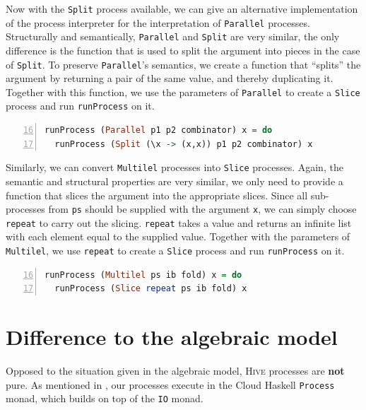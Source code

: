 Now with the \texttt{Split} process available, we can give an alternative implementation of the process interpreter for the interpretation of \texttt{Parallel} processes. Structurally and semantically, \texttt{Parallel} and \texttt{Split} are very similar, the only difference is the function that is used to split the argument into pieces in the case of \texttt{Split}. To preserve \texttt{Parallel}'s semantics, we create a function that \enquote{splits} the argument by returning a pair of the same value, and thereby duplicating it. Together with this function, we use the parameters of \texttt{Parallel} to create a \texttt{Slice} process and run \texttt{runProcess} on it.
\begin{lstlisting}[language=Haskell,caption=Alternative implementation of the interpreter for \texttt{Parallel} processes.,label=lst:local_runprocess_split,numbers=left,frame=bt,firstnumber=16]
runProcess (Parallel p1 p2 combinator) x = do
  runProcess (Split (\x -> (x,x)) p1 p2 combinator) x
\end{lstlisting}

Similarly, we can convert \texttt{Multilel} processes into \texttt{Slice} processes. Again, the semantic and structural properties are very similar, we only need to provide a function that slices the argument into the appropriate slices. Since all sub-processes from \texttt{ps} should be supplied with the argument \texttt{x}, we can simply choose \texttt{repeat} to carry out the slicing. \texttt{repeat} takes a value and returns an infinite list with each element equal to the supplied value. Together with the parameters of \texttt{Multilel}, we use \texttt{repeat} to create a \texttt{Slice} process and run \texttt{runProcess} on it.
\begin{lstlisting}[language=Haskell,caption=Alternative implementation of the interpreter for \texttt{Multilel} processes.,label=lst:local_runprocess_slice,numbers=left,frame=bt,firstnumber=16]
runProcess (Multilel ps ib fold) x = do
  runProcess (Slice repeat ps ib fold) x
\end{lstlisting}

\section{Difference to the algebraic model}
\label{chp:difference_model_implementation}
Opposed to the situation given in the algebraic model, \textsc{Hive} processes are \textbf{not} pure. As mentioned in , our processes execute in the \textsf{Cloud Haskell} \texttt{Process} monad, which builds on top of the \texttt{IO} monad.

